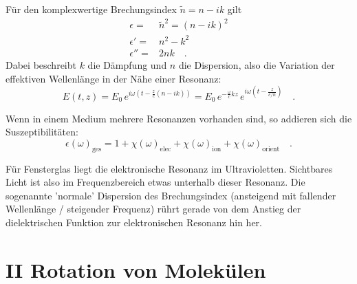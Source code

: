 Für den  komplexwertige Brechungsindex $\tilde{n} = n - i k$ gilt
\begin{align}
 \epsilon = & \tilde{n}^2 = (n - i k)^2 \\
  \epsilon' =& n^2 - k^2 \\
 \epsilon'' = & 2 n k \quad .
\end{align}
Dabei beschreibt $k$ die Dämpfung und $n$ die Dispersion, also die Variation der effektiven Wellenlänge in der Nähe einer Resonanz:
\begin{equation}
E(t,z) = E_0 \, e^{i \omega (t - \frac{z}{c}(n - i k))} = 
 E_0 \, e^{ - \frac{\omega}{c} k z}  
 \, e^{i \omega (t - \frac{z}{c/n} )}  \quad .
\end{equation}

Wenn in einem Medium mehrere Resonanzen vorhanden sind, so addieren sich die Suszeptibilitäten:
\begin{equation}
\epsilon(\omega)_\text{ges} = 1 + \chi(\omega)_\text{elec} +  \chi(\omega)_\text{ion}  + \chi(\omega)_\text{orient} \quad .
\end{equation}

\begin{marginfigure}

\caption{Addition der Suszeptibilitäten. \label{fig:diel_multiple_lorentz}}
\end{marginfigure}

Für Fensterglas liegt die elektronische Resonanz im Ultravioletten. Sichtbares Licht ist also im Frequenzbereich etwas unterhalb dieser Resonanz. Die sogenannte 'normale' Dispersion des Brechungsindex (ansteigend mit fallender Wellenlänge / steigender Frequenz) rührt gerade von dem Anstieg der dielektrischen Funktion zur elektronischen Resonanz hin her.





\section{II Rotation von Molekülen}




